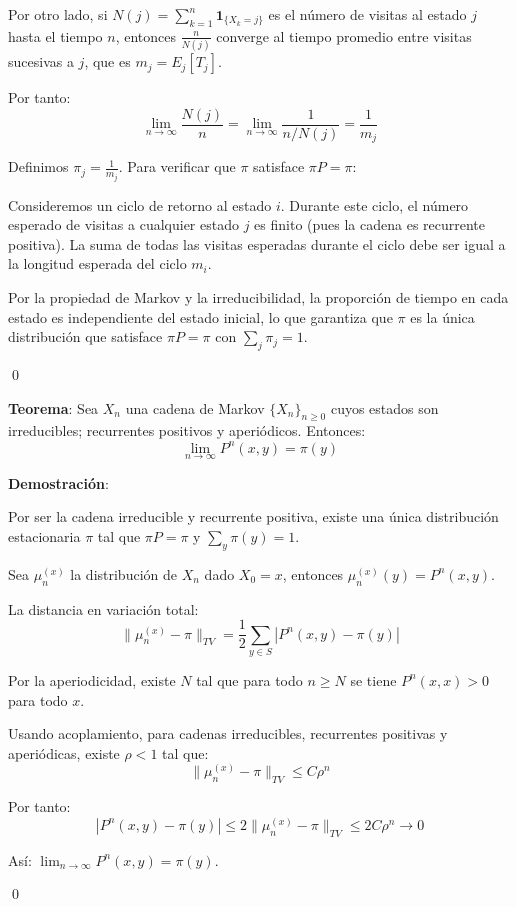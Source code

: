 \documentclass[12pt,a4paper]{article}
\newcommand{\teorema}[1]{%
\begin{teoremabox}
\textbf{Teorema}: #1
\end{teoremabox}
}
\begin{document}
Por otro lado, si $N(j) = \sum_{k=1}^{n} \mathbf{1}_{\{X_k = j\}}$ es el número de visitas al estado $j$ hasta el tiempo $n$, entonces $\frac{n}{N(j)}$ converge al tiempo promedio entre visitas sucesivas a $j$, que es $m_j = E_j[T_j]$.

Por tanto:
\begin{equation*}
\lim_{n \to \infty} \frac{N(j)}{n} = \lim_{n \to \infty} \frac{1}{n/N(j)} = \frac{1}{m_j}
\end{equation*}

Definimos $\pi_j = \frac{1}{m_j}$. Para verificar que $\pi$ satisface $\pi P = \pi$:

Consideremos un ciclo de retorno al estado $i$. Durante este ciclo, el número esperado de visitas a cualquier estado $j$ es finito (pues la cadena es recurrente positiva). La suma de todas las visitas esperadas durante el ciclo debe ser igual a la longitud esperada del ciclo $m_i$.

Por la propiedad de Markov y la irreducibilidad, la proporción de tiempo en cada estado es independiente del estado inicial, lo que garantiza que $\pi$ es la única distribución que satisface $\pi P = \pi$ con $\sum_{j} \pi_j = 1$.

\qed

\teorema{Sea $X_n$ una cadena de Markov $\{X_n\}_{n \geq 0}$ cuyos estados son irreducibles; recurrentes positivos y aperiódicos. Entonces:
\begin{equation*}
\lim_{n \to \infty} P^n(x,y) = \pi(y)
\end{equation*}}

\textbf{Demostración}:

Por ser la cadena irreducible y recurrente positiva, existe una única distribución estacionaria $\pi$ tal que $\pi P = \pi$ y $\sum_{y} \pi(y) = 1$.

Sea $\mu_n^{(x)}$ la distribución de $X_n$ dado $X_0 = x$, entonces $\mu_n^{(x)}(y) = P^n(x,y)$.

La distancia en variación total:
\begin{equation*}
\|\mu_n^{(x)} - \pi\|_{TV} = \frac{1}{2}\sum_{y \in S} |P^n(x,y) - \pi(y)|
\end{equation*}

Por la aperiodicidad, existe $N$ tal que para todo $n \geq N$ se tiene $P^n(x,x) > 0$ para todo $x$.

Usando acoplamiento, para cadenas irreducibles, recurrentes positivas y aperiódicas, existe $\rho < 1$ tal que:
\begin{equation*}
\|\mu_n^{(x)} - \pi\|_{TV} \leq C \rho^n
\end{equation*}

Por tanto:
\begin{equation*}
|P^n(x,y) - \pi(y)| \leq 2\|\mu_n^{(x)} - \pi\|_{TV} \leq 2C \rho^n \to 0 
\end{equation*}

Así: $\lim_{n \to \infty} P^n(x,y) = \pi(y)$.

\qed
\end{document}
